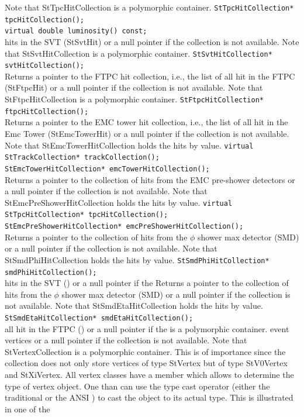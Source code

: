     Note that StTpcHitCollection is a polymorphic container.
    \verb+StTpcHitCollection* tpcHitCollection();+\\  
    \verb+virtual double luminosity() const;+\\
    
    hits in the SVT (StSvtHit) or a null pointer
    if the collection is not available.
    Note that StSvtHitCollection is a polymorphic container.
    \verb+StSvtHitCollection* svtHitCollection();+\\

    Returns a pointer to the FTPC hit collection, i.e., the list of all
    hit in the FTPC (StFtpcHit) or a null pointer
    if the collection is not available.
    Note that StFtpcHitCollection is a polymorphic container.
    \verb+StFtpcHitCollection* ftpcHitCollection();+\\

    Returns a pointer to the EMC tower hit collection, i.e., the list of all
    hit in the Emc Tower (StEmcTowerHit) or a null pointer
    if the collection is not available.
    Note that StEmcTowerHitCollection holds the hits by value.
    \verb+virtual StTrackCollection* trackCollection();+\\
    \verb+StEmcTowerHitCollection* emcTowerHitCollection();+\\
    Returns a pointer to the collection of hits from the EMC pre-shower detectors
    or a null pointer
    if the collection is not available.
    Note that StEmcPreShowerHitCollection holds the hits by value.
    \verb+virtual StTpcHitCollection* tpcHitCollection();+\\ 
    \verb+StEmcPreShowerHitCollection* emcPreShowerHitCollection();+\\
    Returns a pointer to the collection of hits from the $\phi$ shower max detector (SMD)
    or a null pointer
    if the collection is not available.
    Note that StSmdPhiHitCollection holds the hits by value.
    \verb+StSmdPhiHitCollection* smdPhiHitCollection();+\\
    hits in the SVT () or a null pointer if the
    Returns a pointer to the collection of hits from the $\phi$ shower max detector (SMD)
    or a null pointer
    if the collection is not available.
    Note that StSmdEtaHitCollection holds the hits by value.
    \verb+StSmdEtaHitCollection* smdEtaHitCollection();+\\
    all hit in the FTPC () or a null pointer if the
    is a polymorphic container.
    event vertices or a null pointer
    if the collection is not available.
    Note that StVertexCollection is a polymorphic container. This is of
    importance since the collection does not only store vertices of type StVertex
    but of type StV0Vertex and StXiVertex. All vertex classes have a member 
    which allows to determine the type of vertex object. One than can use the type cast
    operator (either the traditional \comp{()} or the ANSI ) to 
    cast the object to its actual type. This is illustrated in one of the

